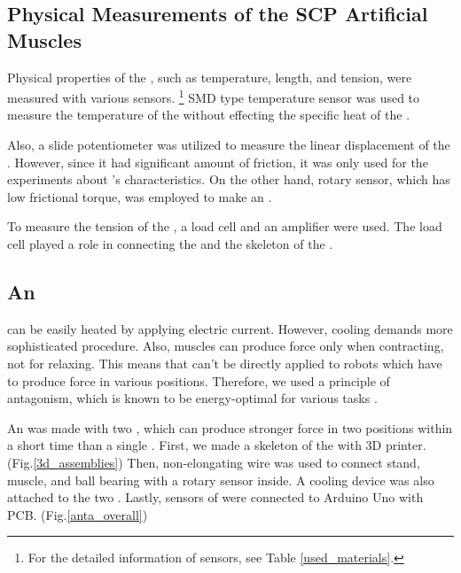 \subsection{Physical Measurements of the SCP Artificial Muscles}
Physical properties of the \scps, such as temperature, length, and tension, were measured with various sensors.
\footnote{For the detailed information of sensors, see Table \ref{used_materials}.}
SMD type temperature sensor was used to measure the temperature of the \scps without effecting the specific heat of the \scpnospace.

Also, a slide potentiometer was utilized to measure the linear displacement of the \scpsnospace. However, since it had significant amount of friction, it was only used for the experiments about \scpnospace's characteristics. On the other hand, rotary sensor, which has low frictional torque, was employed to make an \antanospace. 

To measure the tension of the \scpsnospace, a load cell and an amplifier were used.
The load cell played a role in connecting the \scps and the skeleton of the \antanospace.

\subsection{An \ANTA}
\scps can be easily heated by applying electric current. However, cooling demands more sophisticated procedure. Also, muscles can produce force only when contracting, not for relaxing. This means that \scps can't be directly applied to robots which have to produce force in various positions.
Therefore, we used a principle of antagonism, which is known to be energy-optimal for various tasks \cite{antagonism}.

An \anta was made with two \scpsnospace, which can produce stronger force in two positions within a short time than a single \scpnospace.
First, we made a skeleton of the \anta with 3D printer. (Fig.\ref{3d_assemblies}) Then, non-elongating wire was used to connect stand, muscle, and ball bearing with a rotary sensor inside. A cooling device was also attached to the two \scpsnospace. Lastly, sensors of \anta were connected to Arduino Uno with PCB. (Fig.\ref{anta_overall})

